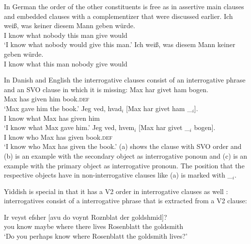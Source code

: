 In German the order of the other constituents is free as in assertive main clauses and embedded
clauses with a complementizer that were discussed earlier. 
\eal
\ex
\gll Ich weiß, was keiner diesem Mann geben würde.\\
     I know    what nobody this man give would\\
\glt `I know what nobody would give this man.'
\ex 
\gll Ich weiß, was diesem Mann keiner geben würde.\\
     I know what this man nobody give would\\
\zl

In Danish and English the interrogative clauses consist of an interrogative phrase and an SVO clause
in which it is missing:
\eal
\ex 
\gll Max har givet ham bogen.\\
     Max has given him book.\textsc{def}\\
\glt `Max gave him the book.'
\ex
\gll Jeg ved, hvad$_i$ [Max har givet ham \_$_i$].\\
     I know what \spacebr{}Max has given him\\
\glt `I know what Max gave him.'
\ex
\gll Jeg ved, hvem$_i$ [Max har givet \_$_i$   bogen].\\
     I know who        \spacebr{}Max has given {} book.\textsc{def}\\
\glt `I know who Max has given the book.'
\zl
(a) shows the clause with SVO order and (b) is an example with the secondary object as
interrogative ponoun and (c) is an example with the primary object as interrogative
pronoun. The position that the respective objects have in non-interrogative clauses like (a)
is marked with \_$_i$.

Yiddish is special in that it has a V2 order in interrogative clauses as well \citep[Sections~4.1, 4.2]{Diesing90a}: interrogatives
consist of a interrogative phrase that is extracted from a V2 clause:

\ea
\gll Ir veyst efsher [avu            do    voynt Roznblat   der goldshmid]?\footnotemark\\
     you know maybe  \spacebr{}where there lives Rosenblatt the goldsmith\\
\glt `Do you perhaps know where Rosenblatt the goldsmith lives?' 
\z


